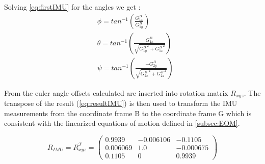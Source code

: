 Solving \cref{eq:firstIMU} for the angles we get :
\begin{align}
   & \phi=tan^{-1}\left(\frac{G_{1x}^B}{G_{1y}^B}\right)
   \label{eq:offset1}
   \\
   & \theta= tan^{-1}\left(\frac{G_{1 x}^B}{\sqrt{{G_{1 y}^B}^{2}+{G_{1 z}^B}^{2}}}\right) 
   \label{eq:offset2}
   \\
   & \psi = tan^{-1}\left(\frac{-G_{2 y}^B}{\sqrt{{G_{2 x}^B}^{2}+{G_{2 z}^B}^{2}}}\right)
   \label{eq:offset3}
\end{align}

From  the euler angle offsets calculated are inserted into rotation matrix \ensuremath{R_{\mathit{xyz}}}. The transpose of the result (\ref{eq:resultIMU}) is then used to transform the IMU measurements from the coordinate frame B to the coordinate frame G which is consistent with the linearized equations of motion defined in \cref{subsec:EOM}.

\begin{equation}
R_{\mathit{IMU}}=R_{\mathit{xyz}}^T=\left(\begin{array}{ccc} 0.9939 & -0.006106 & -0.1105\\ 0.006069 & 1.0 & -0.000675\\ 0.1105 & 0 & 0.9939 \end{array}\right)
    \label{eq:resultIMU}
\end{equation}